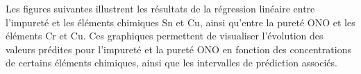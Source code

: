 \documentclass[12pt]{article}
\begin{document}
Les figures suivantes illustrent les résultats de la régression linéaire 
entre l'impureté et les éléments chimiques Sn et Cu, ainsi qu'entre la 
pureté ONO et les éléments Cr et Cu. Ces graphiques permettent de visualiser l'évolution des valeurs 
prédites pour l'impureté et la pureté ONO en fonction des concentrations 
de certains éléments chimiques, ainsi que les intervalles de prédiction 
associés.


\begin{figure}[H]
    \centering
\end{figure}
\end{document}
